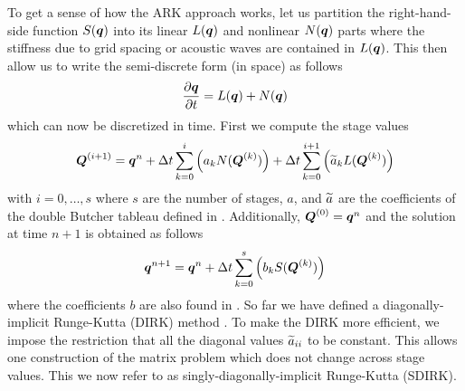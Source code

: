 To get a sense of how the ARK approach works, let us partition the right-hand-side function $S(\mbox{\boldmath$q$\unboldmath})$ into its linear $L(\mbox{\boldmath$q$\unboldmath})$ and nonlinear $N(\mbox{\boldmath$q$\unboldmath})$ parts where the stiffness due to grid spacing or acoustic waves are contained in $L(\mbox{\boldmath$q$\unboldmath})$.  This then allow us to write the semi-discrete form (in space) as follows
\[
\frac{\partial \mbox{\boldmath$q$\unboldmath}}{\partial t} = L(\mbox{\boldmath$q$\unboldmath}) + N(\mbox{\boldmath$q$\unboldmath}) 
\]
which can now be discretized in time.  First we compute the stage values
\[
\mbox{\boldmath$Q$\unboldmath}^{(i+1)}=\mbox{\boldmath$q$\unboldmath}^n + \Delta t \sum_{k=0}^{i} \left( a_k N(\mbox{\boldmath$Q$\unboldmath}^{(k)}) \right) + \Delta t \sum_{k=0}^{i+1} \left( \widetilde{a}_k L(\mbox{\boldmath$Q$\unboldmath}^{(k)}) \right)
\]
with $i=0,\ldots,s$ where $s$ are the number of stages, $a$, and $\widetilde{a}$ are the coefficients of the double Butcher tableau defined in \cite{kennedy:2003,giraldo:2013}.  Additionally, 
$\mbox{\boldmath$Q$\unboldmath}^{(0)}=\mbox{\boldmath$q$\unboldmath}^n$ and the solution at time $n+1$ is obtained as follows
\[
\mbox{\boldmath$q$\unboldmath}^{n+1}=\mbox{\boldmath$q$\unboldmath}^n + \Delta t \sum_{k=0}^{s} \left( b_k S(\mbox{\boldmath$Q$\unboldmath}^{(k)}) \right)
\]
where the coefficients $b$ are also found in \cite{kennedy:2003,giraldo:2013}.
So far we have defined a diagonally-implicit Runge-Kutta (DIRK) method \cite{alexander:1977,butcher:1981a,ascher:1997,boscarino:2009}.  To make the DIRK more efficient, we impose the restriction that all the diagonal values $\widetilde{a}_{ii}$ to be constant. This allows one construction of the matrix problem which does not change across stage values.  This we now refer to as singly-diagonally-implicit Runge-Kutta (SDIRK).







